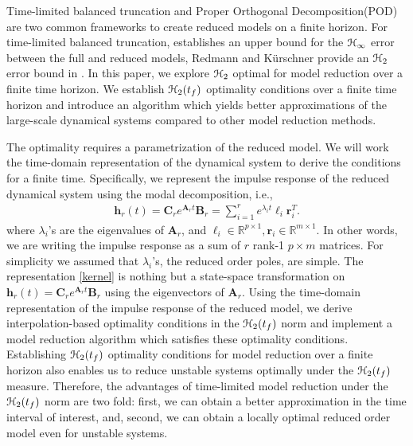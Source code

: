 \documentclass[preprint]{elsarticle}
\theoremstyle{definition}
\theoremstyle{definition}
\def\mathcal{\EuScript}
\numberwithin{equation}{section}
\newcommand{\R}{\mathbb{R}}
\newcommand{\A}{\mathbf{A}}
\newcommand{\B}{\mathbf{B}}
\newcommand{\C}{\mathbf{C}}
\newcommand{\h}{\mathbf{h}}
\newcommand{\tf}{t_f}
\newcommand{\rc}{\boldsymbol{r}}
\newcommand{\lc}{\boldsymbol{\ell}}
\newcommand{\ch}{\mathcal{H}}
\begin{document}
Time-limited balanced truncation\cite{GawJ90, GugA03, RedK17, Kur17} and Proper Orthogonal Decomposition(POD)\cite{HolLB96}  are two common frameworks to create reduced models on a finite horizon. 
For time-limited balanced truncation, \cite{GugA03} establishes an upper bound for the $\ch_\infty$ error between the full and reduced models,  Redmann and K\"urschner provide an $\ch_2$ error bound in \cite{RedK17}. In this paper,  we explore $\ch_2$ optimal for model reduction over a finite time horizon. 
  We establish $\ch_2(\tf)$ optimality conditions over a finite time horizon and introduce an algorithm which yields better approximations of the large-scale dynamical systems compared to other model reduction methods.
 
The optimality requires a parametrization of the reduced model. We will work the time-domain representation of the dynamical system to derive the conditions for a finite time. Specifically, we represent the impulse response of the reduced dynamical system using the modal decomposition, i.e.,
\begin{equation}\label{kernel}
\begin{aligned}
\h_r(t)=\C_r e^{\A_r t}\B_r=\sum_{i=1}^r e^{\lambda_it}\lc_i\rc_i^T.
\end{aligned}
\end{equation}
where $\lambda_i$'s are the eigenvalues of $\A_r$, and $\lc_i \in \R^{p\times 1}, \rc_i\in \R^{m\times1}$. 
In other words, we are writing the impulse response as a sum of $r$ rank-1 $p\times m$  matrices.
For simplicity  we assumed that $\lambda_i$'s, the reduced order poles,  are simple.  The representation \eqref{kernel} 
is nothing but a state-space transformation on $\h_r(t)=\C_r e^{\A_r t}\B_r$ using the eigenvectors of $\A_r$. 
Using the time-domain representation of the impulse response of the reduced model, we derive interpolation-based optimality conditions in the $\ch_2(\tf)$ norm and implement a model reduction algorithm which satisfies these optimality conditions.
Establishing $\ch_2(\tf)$ optimality conditions for model reduction over a finite horizon also enables us to reduce unstable systems optimally under the $\ch_2(\tf)$ measure. Therefore, the advantages of time-limited model reduction under the $\ch_2(\tf)$ norm are two fold: first, we can obtain a better approximation in the time interval of interest, and, second, we can obtain a locally optimal reduced order model even for unstable systems. 
\end{document}
